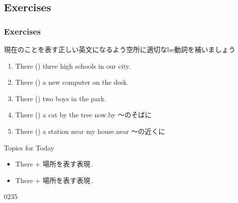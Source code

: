 \documentclass[aspectratio=169,xcolor={dvipsnames,table}]{beamer}
\newcommand{\myaudio}[1]{\href{#1}{\faVolumeUp}}
\begin{document}
\subsection{Exercises}
\begin{frame}[plain]\frametitle{Exercises}

{\small 現在のことを表す正しい英文になるよう空所に適切なbe動詞を補いましょう
  \begin{enumerate}
   \item<2-> There () three high schools in our city.
   \item<4->  There () a new computer on the desk.
   \item<6-> There () two boys in the park.
   \item<8-> There () a cat by the tree now.\hfill{\scriptsize by ～のそばに}
   \item<10-> There () a station near my house.\hfill{\scriptsize near ～の近くに}
  \end{enumerate}


\begin{block}{Topics for Today}
\begin{itemize}[square]
 \item There  $+$ 場所を表す表現\,.
 \item There  $+$ 場所を表す表現\,.
\end{itemize}
\end{block}

\hfill{\tiny 0235}\,{\myaudio{./audio/001_there_is_03.mp3}}}
\end{frame}
\end{document}
